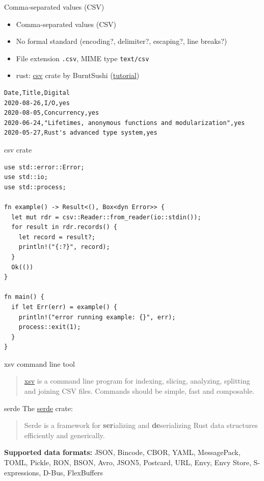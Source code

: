 \documentclass{beamer}
\begin{document}
\begin{frame}[fragile]{Comma-separated values (CSV)}
  \begin{itemize}
    \item Comma-separated values (CSV)
    \item No formal standard (encoding?, delimiter?, escaping?, line breaks?)
    \item File extension \texttt{.csv}, MIME type \texttt{text/csv}
    \item rust: \href{https://github.com/BurntSushi/rust-csv}{csv} crate by BurntSushi (\href{https://docs.rs/csv/1.0.0/csv/tutorial/index.html}{tutorial})
  \end{itemize}

  \begin{verbatim}
Date,Title,Digital
2020-08-26,I/O,yes
2020-08-05,Concurrency,yes
2020-06-24,"Lifetimes, anonymous functions and modularization",yes
2020-05-27,Rust's advanced type system,yes
  \end{verbatim}
\end{frame}

\begin{frame}[fragile]{csv crate}
  \begin{verbatim}
use std::error::Error;
use std::io;
use std::process;

fn example() -> Result<(), Box<dyn Error>> {
  let mut rdr = csv::Reader::from_reader(io::stdin());
  for result in rdr.records() {
    let record = result?;
    println!("{:?}", record);
  }
  Ok(())
}

fn main() {
  if let Err(err) = example() {
    println!("error running example: {}", err);
    process::exit(1);
  }
}
  \end{verbatim}
\end{frame}

\begin{frame}[fragile]{xsv command line tool}
  \begin{quote}
    \href{https://github.com/BurntSushi/xsv}{xsv} is a command line program for indexing, slicing, analyzing, splitting and joining CSV files. Commands should be simple, fast and composable.
  \end{quote}
\end{frame}

\begin{frame}[fragile]{serde}
  The \href{https://serde.rs/}{serde} crate:
  \begin{quote}
    Serde is a framework for \textbf{ser}ializing and \textbf{de}serializing Rust data structures efficiently and generically.
  \end{quote}

  \textbf{Supported data formats:} JSON, Bincode, CBOR, YAML, MessagePack, TOML, Pickle, RON, BSON, Avro, JSON5, Postcard, URL, Envy, Envy Store, S-expressions, D-Bus, FlexBuffers
\end{frame}
\end{document}
